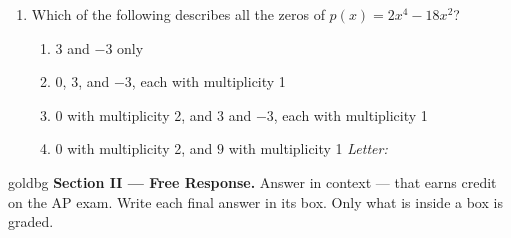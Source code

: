 \documentclass[10pt]{article}
\begin{document}
\begin{enumerate}[leftmargin=1.9em, itemsep=24pt]
\item Which of the following describes all the zeros of $p(x) = 2x^4 - 18x^2$?
      \begin{enumerate}[leftmargin=2.6em, itemsep=2pt]
        \item[(A)] $3$ and $-3$ only
        \item[(B)] $0$, $3$, and $-3$, each with multiplicity 1
        \item[{\color{keyred}$\checkmark$\,(C)}] $0$ with multiplicity 2, and $3$ and $-3$, each with multiplicity 1
        \item[(D)] $0$ with multiplicity 2, and $9$ with multiplicity 1 \hfill\textit{Letter:}~\gradedblank[id=ap5, type=choice, points=1, answer=C]{0.42in}{13pt}
      \end{enumerate}

\end{enumerate}

\newpage

\begin{headlinebox}{goldbg}
\small
\textbf{Section II --- Free Response.} Answer in context --- that earns credit on the AP exam.
Write each final answer in its box. Only what is inside a box is graded.
\end{headlinebox}

\vspace{0.04in}
\end{document}
